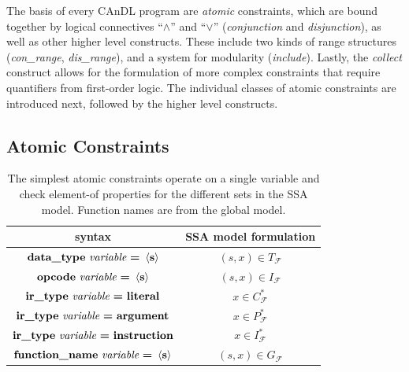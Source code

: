     \noindent
    The basis of every CAnDL program are {\it atomic} constraints, which are
    bound together by logical connectives ``$\land$'' and ``$\lor$''
    ({\it conjunction} and {\it disjunction}), as well as other higher level
    constructs.
    These include two kinds of range structures ({\it con\_range},
    {\it dis\_range}), and a system for modularity ({\it include}).
    Lastly, the {\it collect} construct allows for the formulation of more
    complex constraints that require quantifiers from first-order logic.
    The individual classes of atomic constraints are introduced next,
    followed by the higher level constructs.

\subsection{Atomic Constraints}

\begin{table}[t]
  \centering
  \begin{tabular}{|c|c|}
    \hline
    syntax & SSA model formulation \\
    \hline
    \hline
    $\text{\bf data\_type}\ \text{\it variable}\ \text{\bf =}\ \left<\text{\bf s}\right>$ &  $(s,x)\in T_\mathcal F$\\
    \hline
    $\text{\bf opcode}\ \text{\it variable}\ \text{\bf =}\ \left<\text{\bf s}\right>$ & $(s,x)\in I_\mathcal F$\\
    \hline
    $\text{\bf ir\_type}\ \text{\it variable}\ \text{\bf =}\ \text{\bf literal}$ &  $x\in C_\mathcal F^*$\\
    $\text{\bf ir\_type}\ \text{\it variable}\ \text{\bf =}\ \text{\bf argument}$ & $x\in P_\mathcal F^*$\\
    $\text{\bf ir\_type}\ \text{\it variable}\ \text{\bf =}\ \text{\bf instruction}$ & $x\in I_\mathcal F^*$\\
    \hline
    $\text{\bf function\_name}\ \text{\it variable}\ \text{\bf =}\ \left<\text{\bf s}\right>$ & $(s,x)\in G_\mathcal F$\\
    \hline
  \end{tabular}
  \caption{The simplest atomic constraints operate on a single variable and
           check element-of properties for the different sets in the SSA model.
           Function names are from the global model.}
  \label{onevaratomics}
\end{table}

